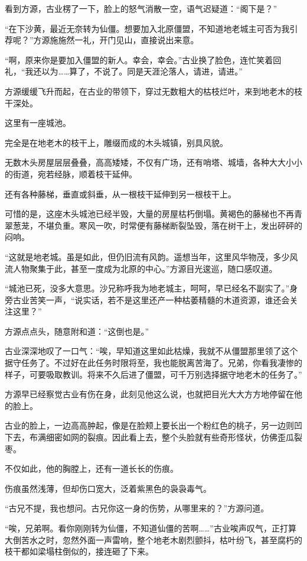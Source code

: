 \begin{this_body}
看到方源，古业楞了一下，脸上的怒气消散一空，语气迟疑道：“阁下是？”

“在下沙黄，最近无奈转为仙僵。想要加入北原僵盟，不知道地老城主可否为我引荐呢？”方源施施然一礼，开门见山，直接说出来意。

“啊，原来你是要加入僵盟的新人。幸会，幸会。”古业换了脸色，连忙笑着回礼，“我还以为……算了，不说了。同是天涯沦落人，请进，请进。”

方源缓缓飞升而起，在古业的带领下，穿过无数粗大的枯枝烂叶，来到地老木的枝干深处。

这里有一座城池。

完全是在地老木的枝干上，雕缀而成的木头城镇，别具风貌。

无数木头房屋层层叠叠，高高矮矮，不仅有广场，还有哨塔、城墙，各种大大小小的街道，宛若经脉，顺着枝干延伸。

还有各种藤梯，垂直或斜垂，从一根枝干延伸到另一根枝干上。

可惜的是，这座木头城池已经半毁，大量的房屋枯朽倒塌。黄褐色的藤梯也不再青翠葱茏，不堪负重。寒风一吹，时常便有藤梯断裂坠毁，落在树干上，发出砰砰的闷响。

“这就是地老城。虽是如此，但仍旧流有风韵。遥想当年，这里风华物茂，多少风流人物聚集于此，甚至一度成为北原的中心。”方源目光逡巡，随口感叹道。

“城池已死，没多大意思。沙兄称呼我为地老城主，呵呵，早已经名不副实了。”身旁古业苦笑一声，“说实话，若不是这里还产一种枯萎精髓的木道资源，谁还会关注这里？”

方源点点头，随意附和道：“这倒也是。”

古业深深地叹了一口气：“唉，早知道这里如此枯燥，我就不从僵盟那里领了这个据守任务了。不过好在此任务时限将至，我也能脱离苦海了。兄弟，你看我凄惨的样子，可要吸取教训。将来不久后进了僵盟，可千万别选择据守地老木的任务了。”

方源早已经察觉古业有伤在身，此刻见他这么说，也就把目光大大方方地停留在他的脸上。

古业的脸上，一边高高肿起，像是在脸颊上要长出一个粉红色的桃子，另一边则凹下去，布满细密如网的裂痕。因此看上去，整个头脸就有些奇形怪状，仿佛歪瓜裂枣。

不仅如此，他的胸膛上，还有一道长长的伤痕。

伤痕虽然浅薄，但却伤口宽大，泛着紫黑色的袅袅毒气。

“古兄不提，我也想问。古兄你这一身的伤势，从哪里来的？”方源问道。

“唉，兄弟啊。看你刚刚转为仙僵，不知道仙僵的苦啊……”古业唉声叹气，正打算大倒苦水之时，忽然外面一声雷响，整个地老木剧烈颤抖，枯叶纷飞，甚至腐朽的枝干都如梁塌柱倒似的，接连砸了下来。


\end{this_body}
